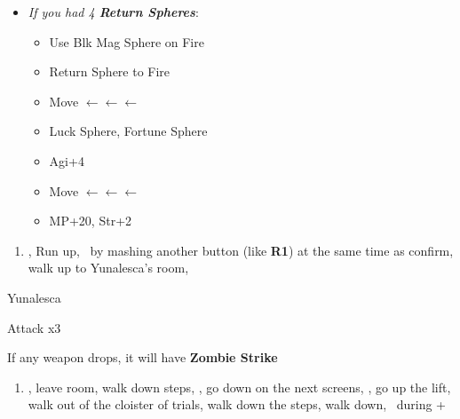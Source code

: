 \begin{spheregrid}
    \begin{itemize}
        \item \textit{If you had 4 \textbf{Return Spheres}}:
            \begin{itemize}
                \item Use Blk Mag Sphere on Fire
                \item Return Sphere to Fire
                \item Move $\leftarrow\leftarrow\leftarrow$
                \item Luck Sphere, Fortune Sphere
                \item Agi+4
                \item Move $\leftarrow\leftarrow\leftarrow$
                \item MP+20, Str+2
            \end{itemize}
    \end{itemize}
\end{spheregrid}
\begin{enumerate}[resume]
    \item \save, Run up, \sd\ by mashing another button (like \textbf{R1}) at the same time as confirm, walk up to Yunalesca's room, \sd
\end{enumerate}
\begin{battle}[132000]{Yunalesca}
    \begin{itemize}
        \summon{\bahamut}
        \bahamutf Attack x3
    \end{itemize}
    If any weapon drops, it will have \textbf{Zombie Strike}
\end{battle}
\begin{enumerate}[resume]
    \item \sd, leave room, walk down steps, \sd, go down on the next screens, \save, go up the lift, walk out of the cloister of trials, walk down the steps, walk down, \sd\ during \cs+\skippablefmv
\end{enumerate}